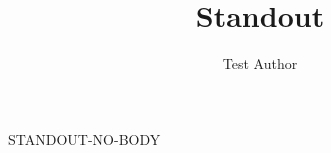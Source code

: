 \documentclass[aspectratio=169,10pt]{beamer}
\title{Standout}
\author{Test Author}
\begin{document}
\begin{frame}[standout]{STANDOUT-NO-BODY}\end{frame}
\end{document}
